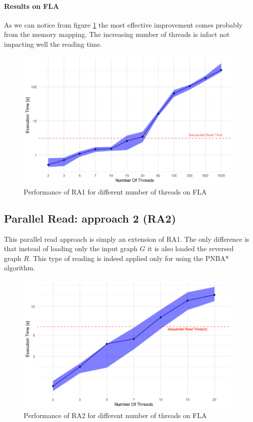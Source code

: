 \documentclass[twocolumn, switch]{article} %
\begin{document}
\paragraph{Results on FLA} 
As we can notice from figure \ref{parread1time} the most effective improvement comes probably from
the memory mapping. The increasing number of threads is infact not impacting well the reading time.
\begin{figure}[ht!]
  \centering
  \includegraphics[width=1\linewidth]{read/par_read_1_time.png}
  \caption{Performance of RA1 for different number of threads on FLA}
  \label{parread1time}
\end{figure}

\subsection{Parallel Read: approach 2 (RA2)}
This parallel read approach is simply an extension of RA1. The only difference is that
instead of loading only the input graph $G$ it is also loaded the reversed graph $R$. This type of
reading is indeed applied only for using the PNBA* algorithm.
\begin{figure}[ht!]
  \centering
  \includegraphics[width=1\linewidth]{read/par_read_2_time.png}
  \caption{Performance of RA2 for different number of threads on FLA}
  \label{parread2time}
\end{figure}
\end{document}
